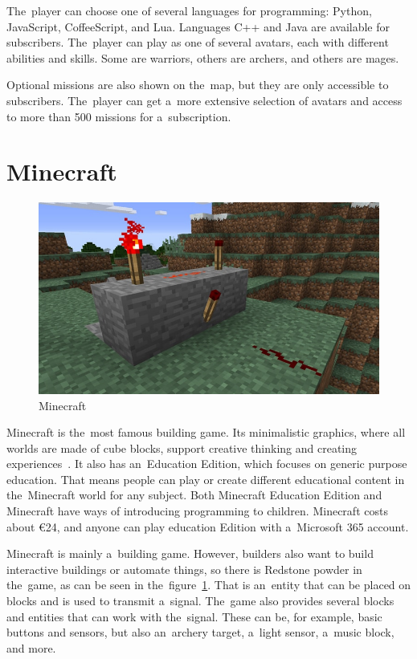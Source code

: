 The~player can choose one of several languages for programming: Python, JavaScript, CoffeeScript, and Lua.
Languages C++ and Java are available for subscribers.
The~player can play as one of several avatars, each with different abilities and skills.
Some are warriors, others are archers, and others are mages.

Optional missions are also shown on the~map, but they are only accessible to subscribers.
The~player can get a~more extensive selection of avatars and access to more than 500 missions for a~subscription.

\pagebreak
\section{Minecraft}
\label{similar-games:minecraft}

\begin{figure}
    \centering
    \includegraphics[width=1\linewidth]{assets/similar-games/minecraft.jpg}
    \caption{Minecraft~\cite{a2022_minecraft}}
    \label{fig:minecraft}
\end{figure}

Minecraft is the~most famous building game.
Its minimalistic graphics, where all worlds are made of cube blocks, support creative thinking and creating experiences~\cite{a2022_minecraft}.
It also has an~Education Edition, which focuses on generic purpose education.
That means people can play or create different educational content in the~Minecraft world for any subject.
Both Minecraft Education Edition and Minecraft have ways of introducing programming to children.
Minecraft costs about €24, and anyone can play education Edition with a~Microsoft 365 account.

Minecraft is mainly a~building game.
However, builders also want to build interactive buildings or automate things, so there is Redstone powder in the~game, as can be seen in the~figure~\ref{fig:minecraft}.
That is an~entity that can be placed on blocks and is used to transmit a~signal.
The~game also provides several blocks and entities that can work with the~signal.
These can be, for example, basic buttons and sensors, but also an~archery target, a~light sensor, a~music block, and more.

